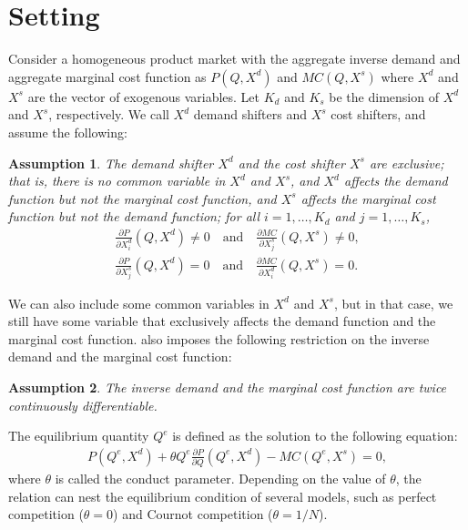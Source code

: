 \documentclass[11pt, a4paper]{article}
\newtheorem{assumption}{Assumption}
\theoremstyle{remark}
\begin{document}
\section{Setting}\label{sec:setting}
Consider a homogeneous product market with the aggregate inverse demand and aggregate marginal cost function as $P(Q, X^{d})$ and $MC(Q, X^{s})$ where $X^{d}$ and $X^{s}$ are the vector of exogenous variables.
Let $K_d$ and $K_s$ be the dimension of $X^{d}$ and $X^{s}$, respectively.
We call $X^{d}$ demand shifters and $X^{s}$ cost shifters, and assume the following:
\begin{assumption}\label{assumption:exclusive_shifters}
    The demand shifter $X^{d}$ and the cost shifter $X^{s}$ are exclusive; that is, there is no common variable in $X^{d}$ and $X^{s}$, and $X^{d}$ affects the demand function but not the marginal cost function, and $X^{s}$ affects the marginal cost function but not the demand function; for all $i = 1, \ldots, K_d$ and $j = 1, \ldots, K_s$,
    \begin{align}
        \frac{\partial P}{\partial X^{d}_{i}}(Q, X^{d}) \ne 0 \quad \text{and} \quad \frac{\partial MC}{\partial X^{s}_{j}}(Q, X^{s}) \ne 0,\\
        \frac{\partial P}{\partial X^{s}_{j}}(Q, X^{d}) = 0 \quad \text{and} \quad \frac{\partial MC}{\partial X^{d}_{i}}(Q, X^{s}) = 0.
    \end{align}
\end{assumption}
We can also include some common variables in $X^{d}$ and $X^{s}$, but in that case, we still have some variable that exclusively affects the demand function and the marginal cost function.
\citet{lau1982identifying} also imposes the following restriction on the inverse demand and the marginal cost function:
\begin{assumption}\label{assumption:twice_differentiable}
    The inverse demand and the marginal cost function are twice continuously differentiable.
\end{assumption}

The equilibrium quantity $Q^e$ is defined as the solution to the following equation:
\begin{align}
    P(Q^e, X^{d}) + \theta Q^e\frac{\partial P}{\partial Q}(Q^e, X^{d}) - MC(Q^e, X^{s}) = 0, \label{eq:foc}
\end{align}
where $\theta$ is called the conduct parameter.
Depending on the value of $\theta$, the relation can nest the equilibrium condition of several models, such as perfect competition ($\theta=0$) and Cournot competition ($\theta=1/N$).
\end{document}
